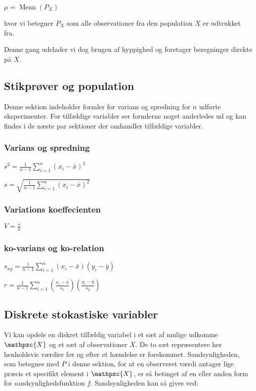\documentclass{article}
\newcommand{\mellemrum}{\vspace{2 ex}}
\newcommand{\cent}[1]{ \mellemrum \begin{center} #1\end{center} \mellemrum }
\newcommand{\op}[1]{\operatorname{#1}}
\newcommand{\summation}[2]{\sum\limits_{#1}^{#2}}
\newcommand{\script}[1]{\mathpzc{#1}}
\begin{document}
	\cent{$ \mu = \op{Mean}(P_X) $}
	
	hvor vi betegner $P_X$ som alle observationer fra den population $X$ er udtrukket fra.
	
	Denne gang udelader vi dog brugen af hyppighed og foretager beregninger direkte på $X$. 
	\pagebreak
	
	\subsection{Stikprøver og population}
	
	Denne sektion indeholder formler for varians og spredning for $n$ udførte eksperimenter. For tilfældige variabler ser formlerne noget anderledes ud og kan findes i de næste par sektioner der omhandler tilfældige variabler.
	\subsubsection{Varians og spredning}
	
	\cent{$ s^2 = \frac{1}{n-1} \summation{i=1}{n} (x_i - \bar{x})^2 $}
	
	\cent{$ s = \sqrt{\frac{1}{n-1} \summation{i=1}{n} (x_i - \bar{x})^2}$}
	
	\subsubsection{Variations koeffecienten}
	
	\cent{$ V = \frac{s}{\bar{x}} $}
	
	\subsubsection{ko-varians og ko-relation}
	
	\cent{$ s_{xy} = \frac{1}{n-1} \summation{i = 1}{n} (x_i-\bar{x}) (y_i-\bar{y}) $}
	\cent{$ r = \frac{1}{n-1} \summation{i = 1}{n} (\frac{x_i-\bar{x}}{s_x}) (\frac{y_i-\bar{y}}{s_y}) $}
	
	\subsection{Diskrete stokastiske variabler}
	
	Vi kan opdele en diskret tilfældig variabel i et sæt af mulige udkomme $ \script{X} $ og et sæt af observationer $ X $. De to sæt repræsentere her henholdsvis værdier før og efter et hændelse er forekommet. Sandsynligheden, som betegnes med $P$ i denne sektion, for at en observeret værdi antager lige præcis et specifikt element i $ \script{X} $, er så betinget af en eller anden form for sandsynlighedsfunktion $f$. Sandsynligheden kan så gives ved:
	
\end{document}
